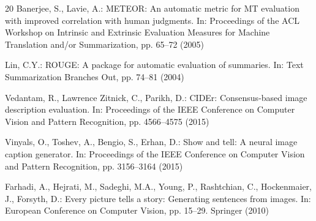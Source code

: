 \documentclass[runningheads]{llncs}
\begin{document}
\begin{thebibliography}{20}
Banerjee, S., Lavie, A.: METEOR: An automatic metric for MT evaluation with improved correlation with human judgments. In: Proceedings of the ACL Workshop on Intrinsic and Extrinsic Evaluation Measures for Machine Translation and/or Summarization, pp. 65--72 (2005)

Lin, C.Y.: ROUGE: A package for automatic evaluation of summaries. In: Text Summarization Branches Out, pp. 74--81 (2004)

Vedantam, R., Lawrence Zitnick, C., Parikh, D.: CIDEr: Consensus-based image description evaluation. In: Proceedings of the IEEE Conference on Computer Vision and Pattern Recognition, pp. 4566--4575 (2015)

Vinyals, O., Toshev, A., Bengio, S., Erhan, D.: Show and tell: A neural image caption generator. In: Proceedings of the IEEE Conference on Computer Vision and Pattern Recognition, pp. 3156--3164 (2015)

Farhadi, A., Hejrati, M., Sadeghi, M.A., Young, P., Rashtchian, C., Hockenmaier, J., Forsyth, D.: Every picture tells a story: Generating sentences from images. In: European Conference on Computer Vision, pp. 15--29. Springer (2010)

\end{thebibliography}
\end{document}
